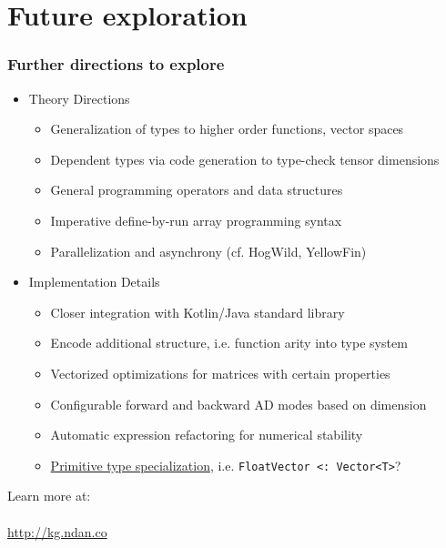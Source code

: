 \documentclass{beamer}
\begin{document}
    \section{Future exploration}\label{sec:fifth-section}

    \begin{frame}
        \frametitle{Further directions to explore}
        \begin{itemize}
            \item Theory Directions
            \begin{itemize}
                \item Generalization of types to higher order functions, vector spaces
                \item Dependent types via code generation to type-check tensor dimensions
                \item General programming operators and data structures
                \item Imperative define-by-run array programming syntax
                \item Parallelization and asynchrony (cf. HogWild, YellowFin)
            \end{itemize}
            \item Implementation Details
            \begin{itemize}
                \item Closer integration with Kotlin/Java standard library
                \item Encode additional structure, i.e. function arity into type system
                \item Vectorized optimizations for matrices with certain properties
                \item Configurable forward and backward AD modes based on dimension
                \item Automatic expression refactoring for numerical stability
                \item \href{https://discuss.kotlinlang.org/t/primitive-type-specialization/11022}{Primitive type specialization}, i.e. \texttt{FloatVector <: Vector<T>}?
            \end{itemize}
        \end{itemize}
    \end{frame}

    \begin{frame}
        \begin{center}
            \Huge{Learn more at: \\~\\
            \url{http://kg.ndan.co}}
        \end{center}
    \end{frame}
\end{document}
